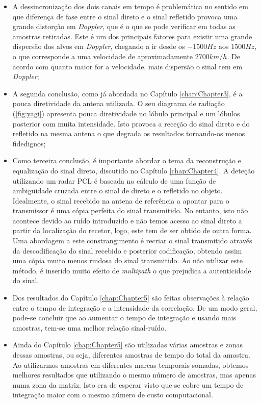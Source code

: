 \begin{itemize}
\item A dessincronização dos dois canais em tempo é problemática no sentido em que diferença de fase entre o sinal direto e o sinal refletido provoca uma grande distorção em \textit{Doppler}, que é o que se pode verificar em todas as amostras retiradas. Este é um dos principais fatores para existir uma grande dispersão dos alvos em \textit{Doppler}, chegando a ir desde os $-1500 Hz$ aos $1500 Hz$, o que corresponde a uma velocidade de aproximadamente $2700 km/h$. De acordo com \cite{He2010} quanto maior for a velocidade, mais dispersão o sinal tem em \textit{Doppler};


\item A segunda conclusão, como já abordada no Capítulo \ref{chap:Chapter3}, é a pouca diretividade da antena utilizada. O seu diagrama de radiação (\ref{fig:yagi}) apresenta pouca diretividade no lóbulo principal e um lóbulos posterior com muita intensidade. Isto provoca a receção do sinal direto e do refletido na mesma antena o que degrada os resultados tornando-os menos fidedignos;


\item Como terceira conclusão, é importante abordar o tema da reconstrução e equalização do sinal direto, discutido no Capítulo \ref{chap:Chapter4}. A deteção utilizando um radar \gls{PCL} é baseada no cálculo de uma função de ambiguidade cruzada entre o sinal de direto e o refletido no objeto. Idealmente, o sinal recebido na antena de referência a apontar para o transmissor é uma cópia perfeita do sinal transmitido. No entanto, isto não acontece devido ao ruído introduzido e não temos acesso ao sinal direto a partir da localização do recetor, logo, este tem de ser obtido de outra forma. Uma abordagem a este constrangimento é recriar o sinal transmitido através da descodificação do sinal recebido e posterior codificação, obtendo assim uma cópia muito menos ruidosa do sinal transmitido. Ao não utilizar este método, é inserido muito efeito de \textit{multipath} o que prejudica a autenticidade do sinal.


\item Dos resultados do Capítulo \ref{chap:Chapter5} são feitas observações à relação entre o tempo de integração e a intensidade da correlação. De um modo geral, pode-se concluir que ao aumentar o tempo de integração e usando mais amostras, tem-se uma melhor relação sinal-ruído.


\item Ainda do Capítulo \ref{chap:Chapter5} são utilizadas várias amostras e zonas dessas amostras, ou seja, diferentes amostras de tempo do total da amostra. Ao utilizarmos amostras em diferentes marcas temporais somadas, obtemos melhores resultados que utilizando o mesmo número de amostras, mas apenas numa zona da matriz. Isto era de esperar visto que se cobre um tempo de integração maior com o mesmo número de custo computacional.



\end{itemize}
